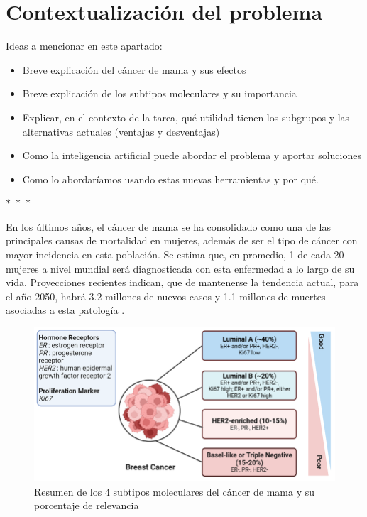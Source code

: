 \documentclass[a4paper,10pt]{book}
\begin{document}
\section{Contextualización del problema}


Ideas a mencionar en este apartado:

\begin{itemize}
  \item Breve explicación del cáncer de mama y sus efectos
  \item Breve explicación de los subtipos moleculares y su importancia
  \item Explicar, en el contexto de la tarea, qué utilidad tienen los subgrupos y las alternativas actuales (ventajas y desventajas)
  \item Como la inteligencia artificial puede abordar el problema y aportar soluciones
  \item Como lo abordaríamos usando estas nuevas herramientas y por qué.
\end{itemize}

\begin{center}
  $\ast$~$\ast$~$\ast$
\end{center}

En los últimos años, el cáncer de mama se ha consolidado como una de las principales causas de mortalidad en mujeres, además de ser el tipo de cáncer con mayor incidencia en esta población. Se estima que, en promedio, 1 de cada 20 mujeres a nivel mundial será diagnosticada con esta enfermedad a lo largo de su vida. Proyecciones recientes indican, que de mantenerse la tendencia actual, para el año 2050, habrá 3.2 millones de nuevos casos y 1.1 millones de muertes asociadas a esta patología \cite{kim_global_2025}.



\begin{figure}
    \centering
    \includegraphics[width=0.8\linewidth]{reports/assets/subtypes.png}
    \caption{Resumen de los 4 subtipos moleculares del cáncer de mama y su porcentaje de relevancia \cite{harnessing_2024}}
    \label{fig:subtypes}
\end{figure}
\end{document}
